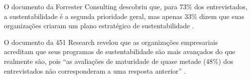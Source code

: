 \documentclass[12pt]{article}
\begin{document}
	O documento da Forrester Consulting descobriu que, para 73\% dos entrevistados, a sustentabilidade é a segunda prioridade geral, mas apenas 33\% dizem que suas organizações criaram um plano estratégico de sustentabilidade \cite{luizgustavopaceteESGPrioridadePara2022}.
	
	O documento da 451 Research revelou que as organizações empresariais acreditam que seus programas de sustentabilidade são mais avançados do que realmente são, pois “as avaliações de maturidade de quase metade (48\%) dos entrevistados não corresponderam a uma resposta anterior” \cite{luizgustavopaceteESGPrioridadePara2022}.
	
	
	
\end{document}

